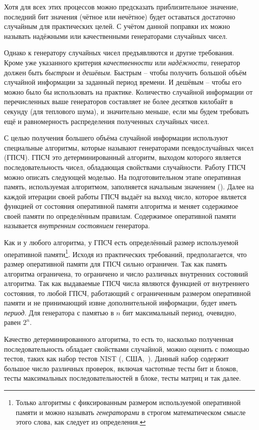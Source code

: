 Хотя для всех этих процессов можно предсказать приблизительное значение, последний бит значения (чётное или нечётное) будет оставаться достаточно случайным для практических целей. С учётом данной поправки их можно называть надёжными или качественными генераторами случайных чисел.

Однако к генератору случайных чисел предъявляются и другие требования. Кроме уже указанного критерия \emph{качественности} или \emph{надёжности}, генератор должен быть \emph{быстрым} и \emph{дешёвым}. Быстрым -- чтобы получить большой объём случайной информации за заданный период времени. И дешёвым -- чтобы его можно было бы использовать на практике. Количество случайной информации от перечисленных выше генераторов составляет не более десятков килобайт в секунду (для теплового шума), и значительно меньше, если мы будем требовать ещё и равномерность распределения полученных случайных чисел.

С целью получения большего объёма случайной информации используют специальные алгоритмы, которые называют генераторами псевдослучайных чисел (ГПСЧ). ГПСЧ это детерминированный алгоритм, выходом которого является последовательность чисел, обладающая свойствами случайности. Работу ГПСЧ можно описать следующей моделью. На подготовительном этапе оперативная память, используемая алгоритмом, заполняется начальным значением (). Далее на каждой итерации своей работы ГПСЧ выдаёт на выход число, которое является функцией от состояния оперативной памяти алгоритма и меняет содержимое своей памяти по определённым правилам. Содержимое оперативной памяти называется \emph{внутренним состоянием} генератора.

Как и у любого алгоритма, у ГПСЧ есть определённый размер используемой оперативной памяти\footnote{Только алгоритмы с фиксированным размером используемой оперативной памяти и можно называть \emph{генераторами} в строгом математическом смысле этого слова, как следует из определения.}. Исходя из практических требований, предполагается, что размер оперативной памяти для ГПСЧ сильно ограничен. Так как память алгоритма ограничена, то ограничено и число различных внутренних состояний алгоритма. Так как выдаваемые ГПСЧ числа являются функцией от внутреннего состояния, то любой ГПСЧ, работающий с ограниченным размером оперативной памяти и не принимающий извне дополнительной информации, будет иметь \emph{период}. Для генератора с памятью в $n$ бит максимальный период, очевидно, равен $2^n$.

Качество детерминированного алгоритма, то есть то, насколько полученная последовательность обладает свойствами случайной, можно оценить с помощью тестов, таких как набор тестов NIST (, США,~\cite{NIST:2001}). Данный набор содержит большое число различных проверок, включая частотные тесты бит и блоков, тесты максимальных последовательностей в блоке, тесты матриц и так далее.

